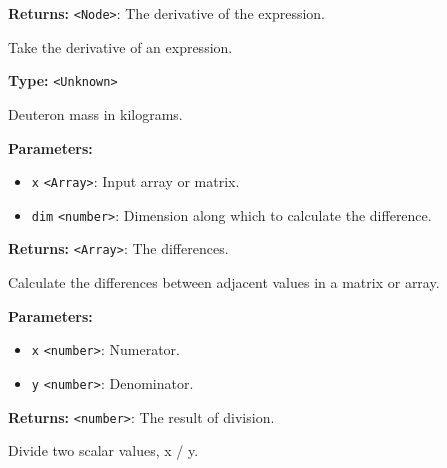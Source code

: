 \documentclass[12pt,a4paper]{article}
\begin{document}
\noindent \textbf{Returns:} \texttt{<Node>}: The derivative of the expression.

\noindent Take the derivative of an expression.

\vspace{5mm}
\noindent {}\vspace{4mm}


\noindent \textbf{Type:} \texttt{<Unknown>}

\noindent Deuteron mass in kilograms.

\vspace{5mm}
\noindent {}


\noindent \textbf{Parameters:}
\begin{itemize}
  \item \texttt{x} \texttt{<Array>}: Input array or matrix.
  \item \texttt{dim} \texttt{<number>}: Dimension along which to calculate the difference.
\end{itemize}

\noindent \textbf{Returns:} \texttt{<Array>}: The differences.

\noindent Calculate the differences between adjacent values in a matrix or array.

\vspace{5mm}
\noindent {}


\noindent \textbf{Parameters:}
\begin{itemize}
  \item \texttt{x} \texttt{<number>}: Numerator.
  \item \texttt{y} \texttt{<number>}: Denominator.
\end{itemize}

\noindent \textbf{Returns:} \texttt{<number>}: The result of division.

\noindent Divide two scalar values, x / y.

\vspace{5mm}
\noindent {}
\end{document}
